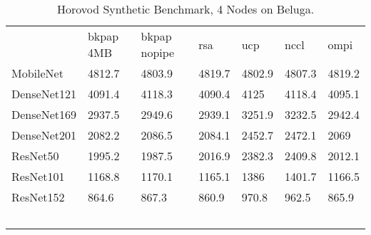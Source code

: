 \begin{table}
    \centering
    \caption{Horovod Synthetic Benchmark, 4 Nodes on Beluga.}
    \begin{tabular}{lllllll}
                & bkpap 4MB & bkpap nopipe & rsa    & ucp    & nccl   & ompi   \\
    MobileNet   & 4812.7    & 4803.9       & 4819.7 & 4802.9 & 4807.3 & 4819.2 \\
    DenseNet121 & 4091.4    & 4118.3       & 4090.4 & 4125   & 4118.4 & 4095.1 \\
    DenseNet169 & 2937.5    & 2949.6       & 2939.1 & 3251.9 & 3232.5 & 2942.4 \\
    DenseNet201 & 2082.2    & 2086.5       & 2084.1 & 2452.7 & 2472.1 & 2069   \\
    ResNet50    & 1995.2    & 1987.5       & 2016.9 & 2382.3 & 2409.8 & 2012.1 \\
    ResNet101   & 1168.8    & 1170.1       & 1165.1 & 1386   & 1401.7 & 1166.5 \\
    ResNet152   & 864.6     & 867.3        & 860.9  & 970.8  & 962.5  & 865.9  \\
    ~           & ~         & ~            & ~      & ~      & ~      & ~      \\
    \end{tabular}
    \label{tbl:bg_hvd_synth_4n}
\end{table}